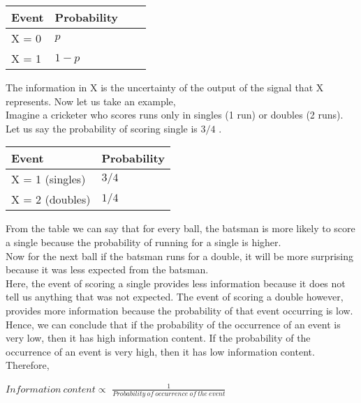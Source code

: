 \documentclass{article}
\begin{document}
\begin{center}
\begin{tabular}{ |  >{\centering\arraybackslash}m{5em} |  >{\centering\arraybackslash}m{3cm} |  >{\centering\arraybackslash}m{3cm} |  >{\centering\arraybackslash}m{3cm}| }
\hline
\textbf{Event}&\textbf{Probability}\\\hline
X = 0 & $p$   \\\hline
X = 1 & $1-p$ \\\hline

\end{tabular}
\end{center}
The information in X is the uncertainty of the output of the signal that X represents.
\newpage
Now let us take an example,\\
Imagine a cricketer who scores runs only in singles (1 run) or doubles (2 runs). Let us say the probability of scoring single is $3/4$ .
\begin{center}
\begin{tabular}{ |  >{\centering\arraybackslash}m{10em} |  >{\centering\arraybackslash}m{5cm} | }
\hline
\textbf{Event}&\textbf{Probability}\\\hline
X = 1 (singles) & $3/4$   \\\hline
X = 2 (doubles) & $1/4$ \\\hline
\end{tabular}
\end{center}
From the table we can say that for every ball, the batsman is more likely to score a single because the probability of running for a single is higher.\\
Now for the next ball if the batsman runs for a double, it will be more surprising because it was less expected from the batsman. \\
Here, the event of scoring a single provides less information because it does not tell us anything that was not expected. The event of scoring a double however, provides more information because the probability of that event occurring is low.\\
Hence, we can conclude that if the probability of the occurrence of an event is very low, then it has high information content. If the probability of the occurrence of an event is very high, then it has low information content. \\
Therefore,
\begin{center}
    $Information \ content \propto$ $\frac{1}{Probability \ of \ occurrence \ of \ the \ event}$
\end{center}
\end{document}
